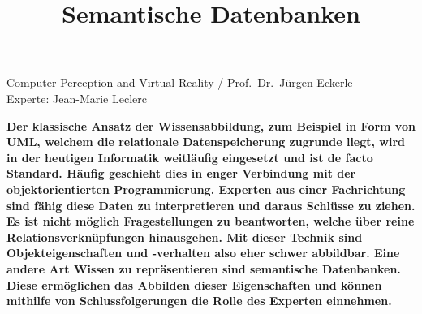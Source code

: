 \documentclass[
    paper=a4,               %
    fontsize=10pt,          %
    open=right,             %
    titlepage=false,        %
    parskip=half,           %
]{scrreprt}                 %
\begin{document}
    \title{Semantische Datenbanken}

    Computer Perception and Virtual Reality / Prof.\ Dr.\ Jürgen Eckerle\\
    Experte: Jean-Marie Leclerc

    \textbf{Der klassische Ansatz der Wissensabbildung, zum Beispiel in Form von UML, welchem die relationale Datenspeicherung zugrunde liegt, wird in der heutigen Informatik weitläufig eingesetzt und ist de facto Standard. Häufig geschieht dies in enger Verbindung mit der objektorientierten Programmierung. Experten aus einer Fachrichtung sind fähig diese Daten zu interpretieren und daraus Schlüsse zu ziehen. Es ist nicht möglich Fragestellungen zu beantworten, welche über reine Relationsverknüpfungen hinausgehen. Mit dieser Technik sind Objekteigenschaften und -verhalten also eher schwer abbildbar. Eine andere Art Wissen zu repräsentieren sind semantische Datenbanken. Diese ermöglichen das Abbilden dieser Eigenschaften und können mithilfe von Schlussfolgerungen die Rolle des Experten einnehmen.}
\end{document}
